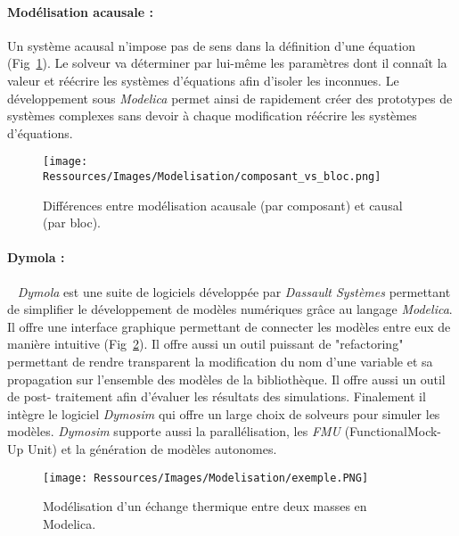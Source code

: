 \paragraph{Modélisation acausale :} %
\label{par:modelisation_acausale}
Un système acausal n’impose pas de sens dans la définition d’une équation (Fig~\ref{fig:acausal_vs_causal}).  Le
solveur va déterminer par lui-même les paramètres dont il connaît la valeur et réécrire
les systèmes d’équations afin d’isoler les inconnues. Le développement sous \textit{Modelica}
permet ainsi de rapidement créer des prototypes de systèmes complexes sans devoir à chaque
modification réécrire les systèmes d’équations.
\begin{figure}
    \begin{center}
        \texttt{[image: Ressources/Images/Modelisation/composant\_vs\_bloc.png]}
    \end{center}
    \caption{Différences entre modélisation acausale (par composant) et causal (par bloc).
             \label{fig:acausal_vs_causal}}
\end{figure}

\paragraph{Dymola :} %
\label{par:dymola}
~
\textit{Dymola} est une suite de logiciels développée par \textit{Dassault Systèmes} permettant de
simplifier le développement de modèles numériques grâce au langage \textit{Modelica}. Il offre une
interface graphique permettant de connecter les modèles entre eux de manière intuitive
(Fig~\ref{fig:exemple_modelica}). Il offre aussi un outil puissant de "refactoring" permettant de rendre
transparent la modification du nom d’une variable et sa propagation sur l’ensemble
des modèles de la bibliothèque. Il offre aussi un outil de post-
traitement afin d’évaluer les résultats des simulations. Finalement il intègre le logiciel
\textit{Dymosim} qui offre un large choix de solveurs pour simuler les modèles. \textit{Dymosim} supporte
aussi la parallélisation, les \emph{FMU} (FunctionalMock-Up Unit) et la génération de modèles
autonomes.
\begin{figure}
    \begin{center}
        \texttt{[image: Ressources/Images/Modelisation/exemple.PNG]}
    \end{center}
    \caption{Modélisation d’un échange thermique entre deux masses en Modelica.
             \label{fig:exemple_modelica}}
\end{figure}

